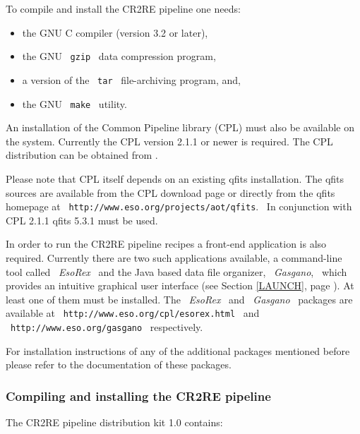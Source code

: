 To compile and install the CR2RE pipeline one needs:
\begin{itemize}
  \item the GNU C compiler (version 3.2 or later),
  \item the GNU \ \texttt{gzip} \ data compression program,
  \item a version of the \ \texttt{tar} \ file-archiving program, and,
  \item the GNU \ \texttt{make} \ utility.
\end{itemize}

An installation of the Common Pipeline library (CPL) must also be
available on the system. Currently the CPL version 2.1.1 or newer is required.
The CPL distribution can be obtained from \cite{CPL}.

Please note that CPL itself depends on an existing qfits installation.
The qfits sources are available from the CPL download page or directly from
the qfits homepage at \ \texttt{http://www.eso.org/projects/aot/qfits}. \ In
conjunction with CPL 2.1.1 qfits 5.3.1 must be used.

In order to run the CR2RE pipeline recipes a front-end application is also
required. Currently there are two such applications available, a
command-line tool called \ \textit{EsoRex} \ and the Java based data file
organizer, \ \textit{Gasgano}, \ which provides an intuitive graphical user
interface (see Section \ref{LAUNCH}, page \pageref{LAUNCH}). At least one 
of them must be installed. The \ \textit{EsoRex} \ and
\ \textit{Gasgano} \ packages are available at
\ \texttt{http://www.eso.org/cpl/esorex.html} \ and
\ \texttt{http://www.eso.org/gasgano} \ respectively.

For installation instructions of any of the additional packages mentioned
before please refer to the documentation of these packages.


\subsubsection{Compiling and installing the CR2RE pipeline}
\label{PIP:compile-howto}

The CR2RE pipeline distribution kit 1.0 contains:

